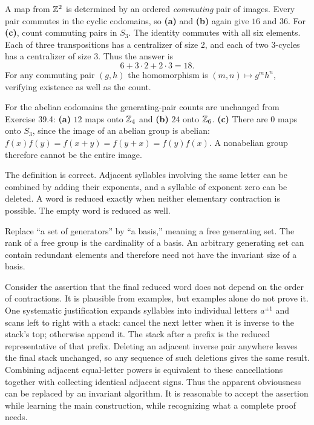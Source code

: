 A map from $\mathbb{Z}^2$ is determined by an ordered \emph{commuting} pair of images. Every pair commutes in the cyclic codomains, so \textbf{(a)} and \textbf{(b)} again give $16$ and $36$.
For \textbf{(c)}, count commuting pairs in $S_3$. The identity commutes with all six elements. Each of three transpositions has a centralizer of size 2, and each of two 3-cycles has a centralizer of size 3. Thus the answer is
\[
6+3\cdot2+2\cdot3=18.
\]
For any commuting pair $(g,h)$ the homomorphism is $(m,n)\mapsto g^mh^n$, verifying existence as well as the count.

For the abelian codomains the generating-pair counts are unchanged from Exercise 39.4: \textbf{(a)} $12$ maps onto $\mathbb{Z}_4$ and \textbf{(b)} $24$ onto $\mathbb{Z}_6$.
\textbf{(c)} There are $0$ maps onto $S_3$, since the image of an abelian group is abelian: $f(x)f(y)=f(x+y)=f(y+x)=f(y)f(x)$. A nonabelian group therefore cannot be the entire image.

The definition is correct. Adjacent syllables involving the same letter can be combined by adding their exponents, and a syllable of exponent zero can be deleted. A word is reduced exactly when neither elementary contraction is possible. The empty word is reduced as well.

Replace ``a set of generators'' by ``a basis,'' meaning a free generating set. The rank of a free group is the cardinality of a basis. An arbitrary generating set can contain redundant elements and therefore need not have the invariant size of a basis.

Consider the assertion that the final reduced word does not depend on the order of contractions. It is plausible from examples, but examples alone do not prove it. One systematic justification expands syllables into individual letters $a^{\pm1}$ and scans left to right with a stack: cancel the next letter when it is inverse to the stack's top; otherwise append it.
The stack after a prefix is the reduced representative of that prefix. Deleting an adjacent inverse pair anywhere leaves the final stack unchanged, so any sequence of such deletions gives the same result. Combining adjacent equal-letter powers is equivalent to these cancellations together with collecting identical adjacent signs. Thus the apparent obviousness can be replaced by an invariant algorithm. It is reasonable to accept the assertion while learning the main construction, while recognizing what a complete proof needs.

